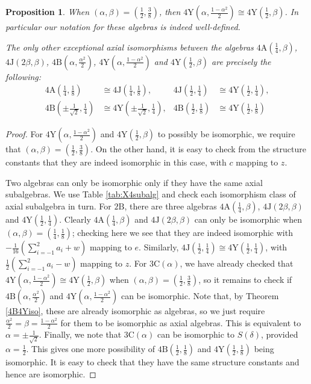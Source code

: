 \documentclass[11pt, a4paper]{article}
\theoremstyle{plain}
\newtheorem{proposition}[theorem]{Proposition}
\theoremstyle{definition}
\newcommand\al{\alpha}
\newcommand\bt{\beta}
\newcommand\dl{\delta}
\newcommand{\A}{\mathrm{A}}
\newcommand{\B}{\mathrm{B}}
\newcommand{\C}{\mathrm{C}}
\newcommand{\J}{\mathrm{J}}
\newcommand{\Y}{\mathrm{Y}}
\newcommand{\0}{\overline{0}}
\newcommand{\2}{\overline{2}}
\newcommand{\1}{\mathbbm{1}}
\begin{document}
\begin{proposition}\label{X4:exceptionaliso}
When $(\al, \bt) = (\frac{1}{2}, \frac{3}{8})$, then $4\Y(\al, \frac{1-\al^2}{2}) \cong 4\Y(\frac{1}{2}, \bt)$.  In particular our notation for these algebras is indeed well-defined.

The only other exceptional axial isomorphisms between the algebras $4\A(\frac{1}{4}, \bt)$, $4\J(2\bt, \bt)$, $4\B(\al, \frac{\al^2}{2})$, $4\Y(\al, \frac{1-\al^2}{2})$ and $4\Y(\frac{1}{2}, \bt)$ are precisely the following:
\begin{align*}
4\A(\tfrac{1}{4}, \tfrac{1}{8}) &\cong 4\J(\tfrac{1}{4}, \tfrac{1}{8}), & 4\J(\tfrac{1}{2}, \tfrac{1}{4}) &\cong 4\Y(\tfrac{1}{2}, \tfrac{1}{4}),\\
4\B(\pm \tfrac{1}{\sqrt{2}}, \tfrac{1}{4}) &\cong 4\Y(\pm \tfrac{1}{\sqrt{2}}, \tfrac{1}{4}), & 4\B(\tfrac{1}{2}, \tfrac{1}{8}) &\cong 4\Y(\tfrac{1}{2}, \tfrac{1}{8})
\end{align*}
\end{proposition}
\begin{proof}
For $4\Y(\al, \frac{1-\al^2}{2})$ and $4\Y(\frac{1}{2}, \bt)$ to possibly be isomorphic, we require that $(\al, \bt) = (\frac{1}{2}, \frac{3}{8})$.  On the other hand, it is easy to check from the structure constants that they are indeed isomorphic in this case, with $c$ mapping to $z$.

Two algebras can only be isomorphic only if they have the same axial subalgebras.  We use Table \ref{tab:X4subalg} and check each isomorphism class of axial subalgebra in turn.  For $2\B$, there are three algebras $4\A(\tfrac{1}{4}, \bt)$, $4\J(2\bt, \bt)$ and $4\Y(\tfrac{1}{2}, \tfrac{1}{4})$.  Clearly $4\A(\tfrac{1}{4}, \bt)$ and $4\J(2\bt, \bt)$ can only be isomorphic when $(\al,\bt) = (\frac{1}{4}, \frac{1}{8})$; checking here we see that they are indeed isomorphic with $-\frac{1}{16}(\sum_{i=-1}^2 a_i + w)$ mapping to $e$.  Similarly, $4\J(\tfrac{1}{2}, \tfrac{1}{4}) \cong 4\Y(\tfrac{1}{2}, \tfrac{1}{4})$, with $\frac{1}{2}(\sum_{i=-1}^2 a_i - w)$ mapping to $z$.  For $3\C(\al)$, we have already checked that $4\Y(\al, \frac{1-\al^2}{2}) \cong 4\Y(\frac{1}{2}, \bt)$ when $(\al, \bt) = (\frac{1}{2}, \frac{3}{8})$, so it remains to check if $4\B(\al, \frac{\al^2}{2})$ and $4\Y(\al, \frac{1-\al^2}{2})$ can be isomorphic.  Note that, by Theorem \ref{4B4Yiso}, these are already isomorphic as algebras, so we just require $\frac{\al^2}{2} = \bt = \frac{1-\al^2}{2}$ for them to be isomorphic as axial algebras.  This is equivalent to $\al = \pm \frac{1}{\sqrt{2}}$.  Finally, we note that $3\C(\al)$ can be isomorphic to $S(\dl)$, provided $\al = \frac{1}{2}$.  This gives one more possibility of $4\B(\frac{1}{2}, \frac{1}{8})$ and $4\Y(\frac{1}{2}, \frac{1}{8})$ being isomorphic.  It is easy to check that they have the same structure constants and hence are isomorphic.
\end{proof}
\end{document}
